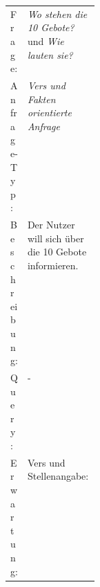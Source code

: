 \begin{table}[H]
	\centering
	\small\renewcommand{\arraystretch}{1.4}
	\begin{tabularx}{0.9\textwidth}{ L{0.15\linewidth} | X  }%
		\hline
		Frage: & \textit{Wo stehen die 10 Gebote?} und \textit{Wie lauten sie?}\\
		Anfrage-Typ: & \textit{Vers und Fakten orientierte Anfrage}\\
		Beschreibung: & Der Nutzer will sich über die 10 Gebote informieren.\\
		Query: & -\\
		Erwartung: & Vers und Stellenangabe:\\
		\hline
	\end{tabularx}
\end{table}

